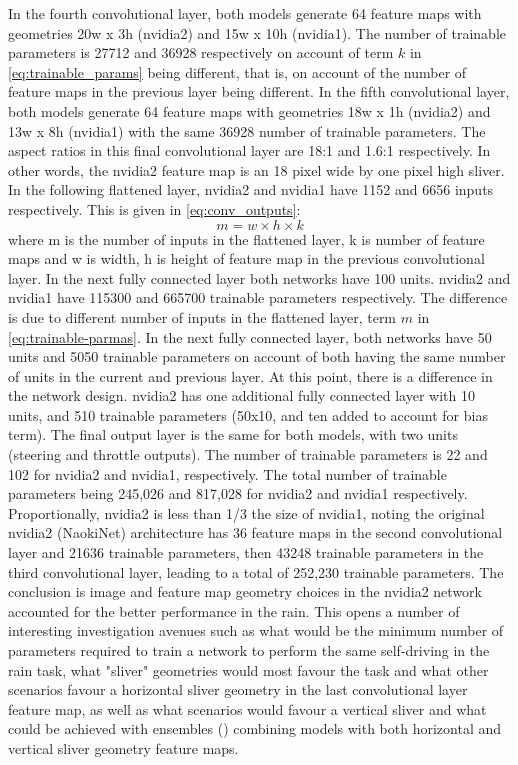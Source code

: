 In the fourth convolutional layer, both models generate 64 feature maps with geometries 20w x 3h (nvidia2) and 15w x 10h (nvidia1). The number of trainable parameters is 27712 and 36928 respectively on account of term $k$ in \ref{eq:trainable_params} being different, that is, on account of the number of feature maps in the previous layer being different.  
In the fifth convolutional layer, both models generate 64 feature maps with geometries 18w x 1h (nvidia2) and 13w x 8h (nvidia1) with the same 36928 number of trainable parameters. The aspect ratios in this final convolutional layer are 18:1 and 1.6:1 respectively. In other words, the nvidia2 feature map is an 18 pixel wide by one pixel high sliver.  
In the following flattened layer, nvidia2 and nvidia1 have 1152 and 6656 inputs respectively. This is given in \ref{eq:conv_outputs}:
\begin{equation}
    \label{eq:conv_outputs}
    m = w \times h \times k
\end{equation}
where m is the number of inputs in the flattened layer, k is number of feature maps and w is width, h is height of feature map in the previous convolutional layer.  
In the next fully connected layer both networks have 100 units. nvidia2 and nvidia1 have 115300 and 665700 trainable parameters respectively. The difference is due to different number of inputs in the flattened layer, term $m$ in \ref{eq:trainable-parmas}.  
In the next fully connected layer, both networks have 50 units and 5050 trainable parameters on account of both having the same number of units in the current and previous layer.  
At this point, there is a difference in the network design. nvidia2 has one additional fully connected layer with 10 units, and 510 trainable parameters (50x10, and ten added to account for bias term). The final output layer is the same for both models, with two units (steering and throttle outputs). The number of trainable parameters is 22 and 102 for nvidia2 and nvidia1, respectively.  
The total number of trainable parameters being 245,026 and 817,028 for nvidia2 and nvidia1 respectively. Proportionally, nvidia2 is less than 1/3 the size of nvidia1, noting the original nvidia2 (NaokiNet) architecture has 36 feature maps in the second convolutional layer and 21636 trainable parameters, then 43248 trainable parameters in the third convolutional layer, leading to a total of 252,230 trainable parameters.  
The conclusion is image and feature map geometry choices in the nvidia2 network accounted for the better performance in the rain. This opens a number of interesting investigation avenues such as what would be the minimum number of parameters required to train a network to perform the same self-driving in the rain task, what "sliver" geometries would most favour the task and what other scenarios favour a horizontal sliver geometry in the last convolutional layer feature map, as well as what scenarios would favour a vertical sliver and what could be achieved with ensembles (\cite{ren2016ensemble}) combining models with both horizontal and vertical sliver geometry feature maps.  
  
